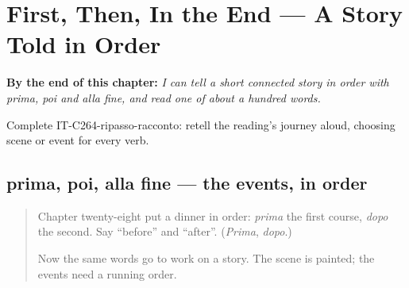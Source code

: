 
\chapter{First, Then, In the End --- A Story Told in Order}
\label{ch:it-a-story-told-in-order}

\begin{chapteropening}
\textbf{By the end of this chapter:} \emph{I can tell a short connected story in order with prima, poi and alla fine, and read one of about a hundred words.}

Complete IT-C264-ripasso-racconto: retell the reading's journey aloud, choosing scene or event for every verb.
\end{chapteropening}

\section[prima, poi, alla fine]{prima, poi, alla fine — the events, in order}

\label{lesson:IT-C264-poi}



\begin{quote}
Chapter twenty-eight put a dinner in order: \emph{prima} the first course, \emph{dopo} the second. Say \textquotedblleft{}before\textquotedblright{} and \textquotedblleft{}after\textquotedblright{}. (\emph{Prima}, \emph{dopo}.)

Now the same words go to work on a story. The scene is painted; the events need a running order.
\end{quote}

